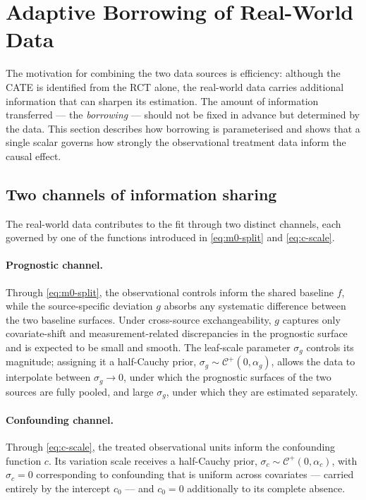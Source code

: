 \documentclass[11pt]{report}
\theoremstyle{plain}
\theoremstyle{definition}
\theoremstyle{remark}
\newcommand{\1}{\mathds{1}}
\theoremstyle{plain}
\theoremstyle{remark}
\newcommand{\half}{\mathcal{C}^{+}}
\begin{document}
\section{Adaptive Borrowing of Real-World Data}
\label{sec:pi-borrowing}

The motivation for combining the two data sources is efficiency: although the
CATE is identified from the RCT alone, the real-world data carries
additional information that can sharpen its estimation. The amount of
information transferred --- the \emph{borrowing} --- should not be fixed in
advance but determined by the data. This section describes how borrowing is
parameterised and shows that a single scalar governs how strongly the
observational treatment data inform the causal effect.

\subsection{Two channels of information sharing}

The real-world data contributes to the fit through two distinct channels,
each governed by one of the functions introduced in \eqref{eq:m0-split} and
\eqref{eq:c-scale}.

\paragraph{Prognostic channel.}
Through \eqref{eq:m0-split}, the observational controls inform the shared
baseline $f$, while the source-specific deviation $g$ absorbs any systematic
difference between the two baseline surfaces. Under cross-source
exchangeability, $g$ captures only covariate-shift and measurement-related
discrepancies in the prognostic surface and is expected to be small and smooth.
The leaf-scale parameter $\sigma_g$ controls its magnitude; assigning it a
half-Cauchy prior, $\sigma_g \sim \half(0, \alpha_g)$, allows the data to
interpolate between $\sigma_g \to 0$, under which the prognostic surfaces of the
two sources are fully pooled, and large $\sigma_g$, under which they are
estimated separately.

\paragraph{Confounding channel.}
Through \eqref{eq:c-scale}, the treated observational units inform the
confounding function $c$. Its variation scale receives a half-Cauchy prior,
$\sigma_c \sim \half(0, \alpha_c)$, with $\sigma_c = 0$ corresponding to
confounding that is uniform across covariates --- carried entirely by the
intercept $c_0$ --- and $c_0 = 0$ additionally to its complete absence.
\end{document}
